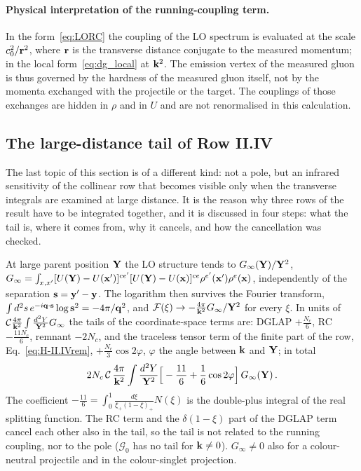 \paragraph{Physical interpretation of the running-coupling term.} In the form~\eqref{eq:LORC} the coupling of the LO spectrum is evaluated at the scale $c_0^2/\mathbf{r}^2$, where $\mathbf{r}$ is the transverse distance conjugate to the measured momentum; in the local form~\eqref{eq:dg_local} at $\mathbf{k}^2$. The emission vertex of the measured gluon is thus governed by the hardness of the measured gluon itself, not by the momenta exchanged with the projectile or the target. The couplings of those exchanges are hidden in $\rho$ and in $U$ and are not renormalised in this calculation.

\subsection{The large-distance tail of Row II.IV}\label{sec:dg_tail}

The last topic of this section is of a different kind: not a pole, but an infrared sensitivity of the collinear row that becomes visible only when the transverse integrals are examined at large distance. It is the reason why three rows of the result have to be integrated together, and it is discussed in four steps: what the tail is, where it comes from, why it cancels, and how the cancellation was checked.

At large parent position $\mathbf{Y}$ the LO structure tends to $G_\infty(\mathbf{Y})/\mathbf{Y}^2$, $G_\infty=\int_{x,x'}[U(\mathbf{Y})-U(\mathbf{x}')]^{ce'}[U(\mathbf{Y})-U(\mathbf{x})]^{ce}\rho^{e'}(\mathbf{x}')\rho^e(\mathbf{x})$, independently of the separation $\mathbf{s}=\mathbf{y}'-\mathbf{y}$. The logarithm then survives the Fourier transform, $\int d^2s\,e^{-i\mathbf{q}\cdot\mathbf{s}}\log\mathbf{s}^2=-4\pi/\mathbf{q}^2$, and $\mathcal F(\xi)\to-\frac{4\pi}{\mathbf{k}^2}G_\infty/\mathbf{Y}^2$ for every $\xi$. In units of $\mathcal C\frac{4\pi}{\mathbf{k}^2}\int\frac{d^2Y}{\mathbf{Y}^2}G_\infty$ the tails of the coordinate-space terms are: DGLAP $+\frac{N_c}{6}$, RC $-\frac{11N_c}{6}$, remnant $-2N_c$, and the traceless tensor term of the finite part of the row, Eq.~\eqref{eq:H-II.IVrem}, $+\frac{N_c}{3}\cos2\varphi$, $\varphi$ the angle between $\mathbf{k}$ and $\mathbf{Y}$; in total
\begin{align}\label{eq:dg_tailtot}
2N_c\,\mathcal C\,\frac{4\pi}{\mathbf{k}^2}\int\frac{d^2Y}{\mathbf{Y}^2}\Big[-\frac{11}{6}+\frac16\cos2\varphi\Big]\,G_\infty(\mathbf{Y})\,.
\end{align}
The coefficient $-\frac{11}{6}=\int_0^1\frac{d\xi}{\xi_+(1-\xi)_+}N(\xi)$ is the double-plus integral of the real splitting function. The RC term and the $\delta(1-\xi)$ part of the DGLAP term cancel each other also in the tail, so the tail is not related to the running coupling, nor to the pole ($\mathcal G_0$ has no tail for $\mathbf{k}\neq0$). $G_\infty\neq0$ also for a colour-neutral projectile and in the colour-singlet projection.

